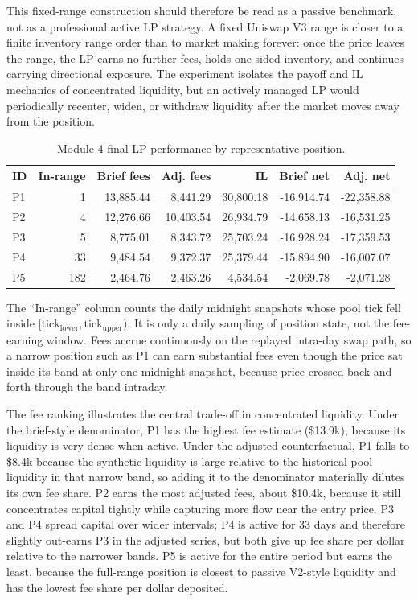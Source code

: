 This fixed-range construction should therefore be read as a passive benchmark,
not as a professional active LP strategy. A fixed Uniswap V3 range is closer to
a finite inventory range order than to market making forever: once the price
leaves the range, the LP earns no further fees, holds one-sided inventory, and
continues carrying directional exposure. The experiment isolates the payoff and
IL mechanics of concentrated liquidity, but an actively managed LP would
periodically recenter, widen, or withdraw liquidity after the market moves away
from the position.

\begin{table}[t]
    \centering
    \caption{Module 4 final LP performance by representative position.}
    \label{tab:m4-summary}
    \small
    \begin{tabular}{lrrrrrr}
        \hline
        ID & In-range & Brief fees & Adj. fees & IL & Brief net & Adj. net \\
        \hline
        P1 & 1   & 13{,}885.44 &  8{,}441.29 & 30{,}800.18 & -16{,}914.74 & -22{,}358.88 \\
        P2 & 4   & 12{,}276.66 & 10{,}403.54 & 26{,}934.79 & -14{,}658.13 & -16{,}531.25 \\
        P3 & 5   &  8{,}775.01 &  8{,}343.72 & 25{,}703.24 & -16{,}928.24 & -17{,}359.53 \\
        P4 & 33  &  9{,}484.54 &  9{,}372.37 & 25{,}379.44 & -15{,}894.90 & -16{,}007.07 \\
        P5 & 182 &  2{,}464.76 &  2{,}463.26 &  4{,}534.54 &  -2{,}069.78 &  -2{,}071.28 \\
        \hline
    \end{tabular}
\end{table}

The ``In-range'' column counts the daily midnight snapshots whose pool
tick fell inside $[\mathrm{tick}_{\mathrm{lower}},\mathrm{tick}_{\mathrm{upper}})$.
It is only a daily sampling of position state, not the fee-earning window. Fees
accrue continuously on the replayed intra-day swap path, so a narrow position
such as P1 can earn substantial fees even though the price sat inside its band at
only one midnight snapshot, because price crossed back and forth through the band
intraday.

The fee ranking illustrates the central trade-off in concentrated liquidity.
Under the brief-style denominator, P1 has the highest fee estimate
(\$13.9k), because its liquidity is very dense when active. Under the adjusted
counterfactual, P1 falls to \$8.4k because the synthetic liquidity is large
relative to the historical pool liquidity in that narrow band, so adding it to
the denominator materially dilutes its own fee share. P2 earns the most adjusted
fees, about \$10.4k, because it still concentrates capital tightly while
capturing more flow near the entry price. P3 and P4 spread capital over wider
intervals; P4 is active for 33 days and therefore slightly out-earns P3 in the
adjusted series, but both give up fee share per dollar relative to the narrower
bands. P5 is active for the entire period but earns the least, because the
full-range position is closest to passive V2-style liquidity and has the lowest
fee share per dollar deposited.

